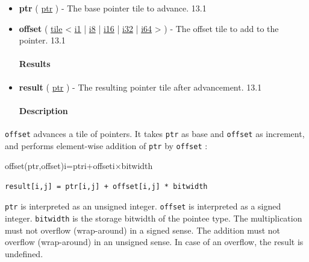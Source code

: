 \documentclass{article}
\begin{document}
\begin{itemize}
\item \textbf{ptr} ( \href{https://docs.nvidia.com/cuda/tile-ir/latest/sections/types.html#type-ptr}{ptr} ) - The base pointer tile to advance. 13.1
\item \textbf{offset} ( \href{https://docs.nvidia.com/cuda/tile-ir/latest/sections/types.html#type-tile}{tile} < \href{https://docs.nvidia.com/cuda/tile-ir/latest/sections/types.html#subsection-element-types}{i1} | \href{https://docs.nvidia.com/cuda/tile-ir/latest/sections/types.html#subsection-element-types}{i8} | \href{https://docs.nvidia.com/cuda/tile-ir/latest/sections/types.html#subsection-element-types}{i16} | \href{https://docs.nvidia.com/cuda/tile-ir/latest/sections/types.html#subsection-element-types}{i32} | \href{https://docs.nvidia.com/cuda/tile-ir/latest/sections/types.html#subsection-element-types}{i64} > ) - The offset tile to add to the pointer. 13.1


\paragraph{Results}

\item \textbf{result} ( \href{https://docs.nvidia.com/cuda/tile-ir/latest/sections/types.html#type-ptr}{ptr} ) - The resulting pointer tile after advancement. 13.1


\paragraph{Description}

\end{itemize}
\texttt{offset} advances a tile of pointers. It takes \texttt{ptr} as base and \texttt{offset} as increment, and performs element-wise addition of \texttt{ptr} by \texttt{offset} :


offset(ptr,offset)i=ptri+offseti×bitwidth

\begin{lstlisting}
result[i,j] = ptr[i,j] + offset[i,j] * bitwidth
\end{lstlisting}

\texttt{ptr} is interpreted as an unsigned integer. \texttt{offset} is interpreted as a signed integer. \texttt{bitwidth} is the storage bitwidth of the pointee type. The multiplication must not overflow (wrap-around) in a signed sense. The addition must not overflow (wrap-around) in an unsigned sense. In case of an overflow, the result is undefined.
\end{document}
